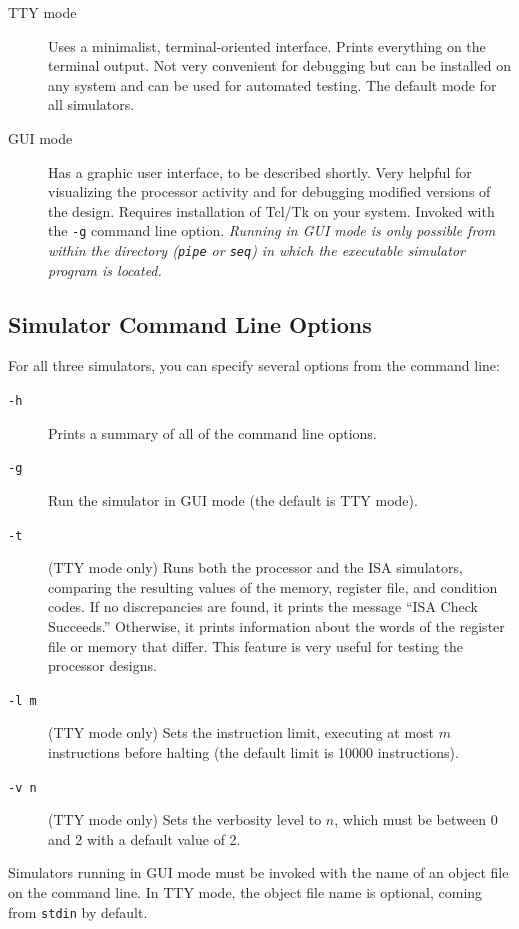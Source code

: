 \documentclass[11pt]{article}
\begin{document}
\begin{description}
\item [TTY mode]
Uses a minimalist, terminal-oriented interface.  Prints
everything on the terminal output.  Not very convenient for debugging
but can be installed on any system and can be used for
automated testing. The default mode for all simulators.

\item [GUI mode] Has a graphic user interface, to be described
  shortly.  Very helpful for visualizing the processor activity and
  for debugging modified versions of the design.  Requires
  installation of Tcl/Tk on your system. Invoked with the \texttt{-g}
  command line option.  {\em Running in GUI mode is only possible from
    within the directory (\texttt{pipe} or \texttt{seq}) in which the
    executable simulator program is located.}

\end{description}

\subsection{Simulator Command Line Options}

For all three simulators, you can specify several options from the command line:
\begin{description}

\item [\texttt{-h}]  
Prints a summary of all of the command line options.

\item[\texttt{-g} ]
Run the simulator in GUI mode (the default is TTY mode). 

\item[\texttt{-t} ]
(TTY mode only) Runs both the processor and the ISA simulators, comparing the
resulting values of the memory, register file, and condition codes.
If no discrepancies are found, it prints the message ``ISA Check
Succeeds.''  Otherwise, it prints information about the words of the
register file or memory that differ.  This feature is very useful for
testing the processor designs.

\item[\texttt{-l m} ]
(TTY mode only) Sets the instruction limit, executing at most $m$ instructions
before halting (the default limit is 10000 instructions).

\item[\texttt{-v n} ]
(TTY mode only) Sets the verbosity level to $n$, which must be between 0 and 2 with a
default value of 2. 


\end{description}
Simulators running in GUI mode must be invoked with the name of an object
file on the command line. In TTY mode, the object file name is
optional, coming from \texttt{stdin} by default. 
\end{document}
